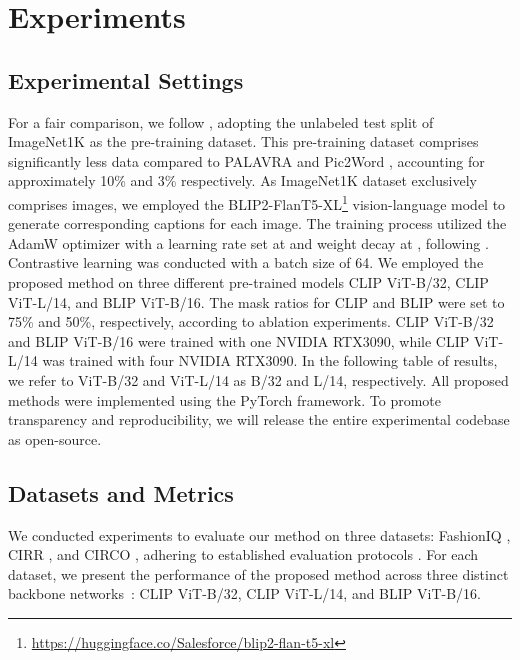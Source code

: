 \documentclass[10pt,twocolumn,letterpaper]{article}
\begin{document}
\section{Experiments}

\subsection{Experimental Settings}
For a fair comparison, we follow \cite{Baldrati_2023_ICCV}, adopting the unlabeled test split of ImageNet1K \cite{russakovsky2015imagenet} as the pre-training dataset. This pre-training dataset comprises significantly less data compared to PALAVRA \cite{cohen2022my} and Pic2Word \cite{saito2023pic2word}, accounting for approximately 10\% and 3\% respectively. As ImageNet1K dataset exclusively comprises images, we employed the BLIP2-FlanT5-XL\footnote{\url{https://huggingface.co/Salesforce/blip2-flan-t5-xl}} vision-language model to generate corresponding captions for each image. The training process utilized the AdamW \cite{loshchilov2019decoupled} optimizer with a learning rate set at  and weight decay at , following \cite{baldrati2022conditioned}. Contrastive learning was conducted with a batch size of 64. We employed the proposed method on three different pre-trained models CLIP ViT-B/32, CLIP ViT-L/14, and BLIP ViT-B/16. The mask ratios for CLIP and BLIP were set to 75\% and 50\%, respectively, according to ablation experiments. CLIP ViT-B/32 and BLIP ViT-B/16 were trained with one NVIDIA RTX3090, while CLIP ViT-L/14 was trained with four NVIDIA RTX3090. In the following table of results, we refer to ViT-B/32 and ViT-L/14 as B/32 and L/14, respectively. All proposed methods were implemented using the PyTorch \cite{NEURIPS2019_bdbca288} framework. To promote transparency and reproducibility, we will release the entire experimental codebase as open-source.


\subsection{Datasets and Metrics}
We conducted experiments to evaluate our method on three datasets: FashionIQ \cite{wu2021fashion}, CIRR \cite{liu2021image}, and CIRCO \cite{Baldrati_2023_ICCV}, adhering to established evaluation protocols \cite{baldrati2022effective}. For each dataset, we present the performance of the proposed method across three distinct backbone networks~\cite{radford2021clip, li2022blip}: CLIP ViT-B/32, CLIP ViT-L/14, and BLIP ViT-B/16.
\end{document}
